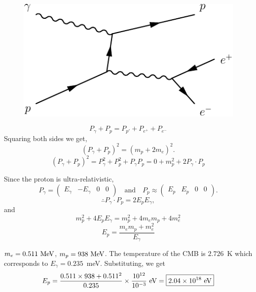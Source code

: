\begin{figure}[H]
  \centering
  \includegraphics{feynmp/BH_pg.pdf}
\end{figure}

\begin{equation}
  P_\gamma + P_p = P_{p'} + P_{e^{+}} + P_{e^{-}}
\end{equation}
Squaring both sides we get,
\begin{equation}
  (P_\gamma + P_p)^2 = (m_p + 2m_e)^2.
\end{equation}
\begin{equation}
  (P_\gamma + P_p)^2 = P_\gamma^2 + P_p^2 + P_\gamma P_p = 0 + m_p^2 + 2 P_\gamma \cdot P_p
\end{equation}

Since the proton is ultra-relativistic,
\begin{equation}
  P_\gamma =  \begin{pmatrix} E_\gamma & -E_\gamma & 0 & 0 \end{pmatrix}
  \quad \text{and} \quad
  P_p \approx \begin{pmatrix} E_p      & E_p       & 0 & 0 \end{pmatrix}.
\end{equation}
\begin{equation}
  \therefore P_\gamma \cdot P_p = 2 E_p E_\gamma,
\end{equation}
and
\begin{equation}
  m_p^2 + 4 E_p E_\gamma = m_p^2 + 4 m_e m_p + 4 m_e^2
\end{equation}
\begin{equation}
  \boxed{ E_p = \frac{m_e m_p + m_e^2}{E_\gamma} }
\end{equation}

$m_e = 0.511~\text{MeV}$, $m_p = 938~\text{MeV}$. The temperature of the CMB is $2.726$~K which corresponds to $E_\gamma = 0.235$~meV. Substituting, we get
\begin{equation}
  E_p = \frac{0.511\times 938 + 0.511^2}{0.235} \times \frac{10^{12}}{10^{-3}} ~\text{eV}
      = \boxed{ 2.04\times 10^{18} ~\text{eV} }
\end{equation}

